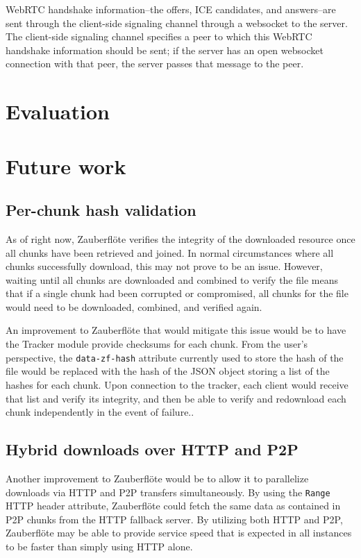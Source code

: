 \documentclass[letterpaper,twocolumn,10pt]{article}
\newcommand{\zbf}{Zauberfl\"{o}te\xspace}
\begin{document}
WebRTC handshake information--the offers, ICE candidates, and answers--are
sent through the client-side signaling channel through a websocket to
the server. The client-side signaling channel specifies a peer to which
this WebRTC handshake information should be sent; if the server has an open
websocket connection with that peer, the server passes that message to the peer.

\section{Evaluation}


\section{Future work}

\subsection{Per-chunk hash validation}
As of right now, \zbf verifies the integrity of the downloaded resource once all chunks have been retrieved and joined. In normal circumstances where all chunks successfully download, this may not prove to be an issue. However, waiting until all chunks are downloaded and combined to verify the file means that if a single chunk had been corrupted or compromised, all chunks for the file would need to be downloaded, combined, and verified again.

An improvement to \zbf that would mitigate this issue would be to have the Tracker module provide checksums for each chunk. From the user's perspective, the \texttt{data-zf-hash} attribute currently used to store the hash of the file would be replaced with the hash of the JSON object storing a list of the hashes for each chunk. Upon connection to the tracker, each client would receive that list and verify its integrity, and then be able to verify and redownload each chunk independently in the event of failure..

\subsection{Hybrid downloads over HTTP and P2P}

Another improvement to \zbf would be to allow it to parallelize downloads via HTTP and P2P transfers simultaneously. By using the \texttt{Range} HTTP header attribute, \zbf could fetch the same data as contained in P2P chunks from the HTTP fallback server. By utilizing both HTTP and P2P, \zbf may be able to provide service speed that is expected in all instances to be faster than simply using HTTP alone.
\end{document}
